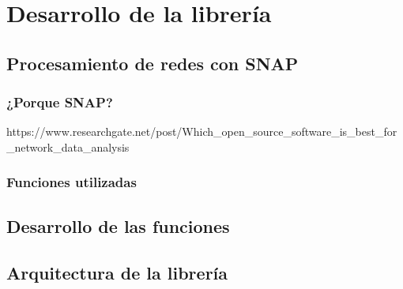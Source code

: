 \section{Desarrollo de la librería}

\subsection{Procesamiento de redes con SNAP}

\subsubsection{¿Porque SNAP?}
https://www.researchgate.net/post/Which_open_source_software_is_best_for_network_data_analysis


\subsubsection{Funciones utilizadas}

\subsection{Desarrollo de las funciones}



\subsection{Arquitectura de la librería}